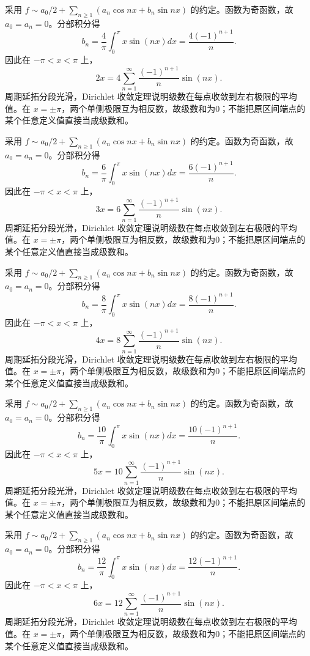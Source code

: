 \documentclass[UTF8,12pt,a4paper,fontset=fandol]{ctexart}
\begin{document}
\begin{solve}\label{ans:c28q14}
采用 $f\sim a_0/2+\sum_{n\ge1}(a_n\cos nx+b_n\sin nx)$ 的约定。函数为奇函数，故 $a_0=a_n=0$。分部积分得
\[
b_n=\frac{4}\pi\int_0^\pi x\sin(nx)dx=\frac{4(-1)^{n+1}}n.
\]
因此在 $-\pi<x<\pi$ 上，
\[
2x=4\sum_{n=1}^\infty\frac{(-1)^{n+1}}n\sin(nx).
\]
周期延拓分段光滑，Dirichlet 收敛定理说明级数在每点收敛到左右极限的平均值。在 $x=\pm\pi$，两个单侧极限互为相反数，故级数和为0；不能把原区间端点的某个任意定义值直接当成级数和。
\end{solve}

\begin{solve}\label{ans:c28q15}
采用 $f\sim a_0/2+\sum_{n\ge1}(a_n\cos nx+b_n\sin nx)$ 的约定。函数为奇函数，故 $a_0=a_n=0$。分部积分得
\[
b_n=\frac{6}\pi\int_0^\pi x\sin(nx)dx=\frac{6(-1)^{n+1}}n.
\]
因此在 $-\pi<x<\pi$ 上，
\[
3x=6\sum_{n=1}^\infty\frac{(-1)^{n+1}}n\sin(nx).
\]
周期延拓分段光滑，Dirichlet 收敛定理说明级数在每点收敛到左右极限的平均值。在 $x=\pm\pi$，两个单侧极限互为相反数，故级数和为0；不能把原区间端点的某个任意定义值直接当成级数和。
\end{solve}

\begin{solve}\label{ans:c28q16}
采用 $f\sim a_0/2+\sum_{n\ge1}(a_n\cos nx+b_n\sin nx)$ 的约定。函数为奇函数，故 $a_0=a_n=0$。分部积分得
\[
b_n=\frac{8}\pi\int_0^\pi x\sin(nx)dx=\frac{8(-1)^{n+1}}n.
\]
因此在 $-\pi<x<\pi$ 上，
\[
4x=8\sum_{n=1}^\infty\frac{(-1)^{n+1}}n\sin(nx).
\]
周期延拓分段光滑，Dirichlet 收敛定理说明级数在每点收敛到左右极限的平均值。在 $x=\pm\pi$，两个单侧极限互为相反数，故级数和为0；不能把原区间端点的某个任意定义值直接当成级数和。
\end{solve}

\begin{solve}\label{ans:c28q17}
采用 $f\sim a_0/2+\sum_{n\ge1}(a_n\cos nx+b_n\sin nx)$ 的约定。函数为奇函数，故 $a_0=a_n=0$。分部积分得
\[
b_n=\frac{10}\pi\int_0^\pi x\sin(nx)dx=\frac{10(-1)^{n+1}}n.
\]
因此在 $-\pi<x<\pi$ 上，
\[
5x=10\sum_{n=1}^\infty\frac{(-1)^{n+1}}n\sin(nx).
\]
周期延拓分段光滑，Dirichlet 收敛定理说明级数在每点收敛到左右极限的平均值。在 $x=\pm\pi$，两个单侧极限互为相反数，故级数和为0；不能把原区间端点的某个任意定义值直接当成级数和。
\end{solve}

\begin{solve}\label{ans:c28q18}
采用 $f\sim a_0/2+\sum_{n\ge1}(a_n\cos nx+b_n\sin nx)$ 的约定。函数为奇函数，故 $a_0=a_n=0$。分部积分得
\[
b_n=\frac{12}\pi\int_0^\pi x\sin(nx)dx=\frac{12(-1)^{n+1}}n.
\]
因此在 $-\pi<x<\pi$ 上，
\[
6x=12\sum_{n=1}^\infty\frac{(-1)^{n+1}}n\sin(nx).
\]
周期延拓分段光滑，Dirichlet 收敛定理说明级数在每点收敛到左右极限的平均值。在 $x=\pm\pi$，两个单侧极限互为相反数，故级数和为0；不能把原区间端点的某个任意定义值直接当成级数和。
\end{solve}
\end{document}
